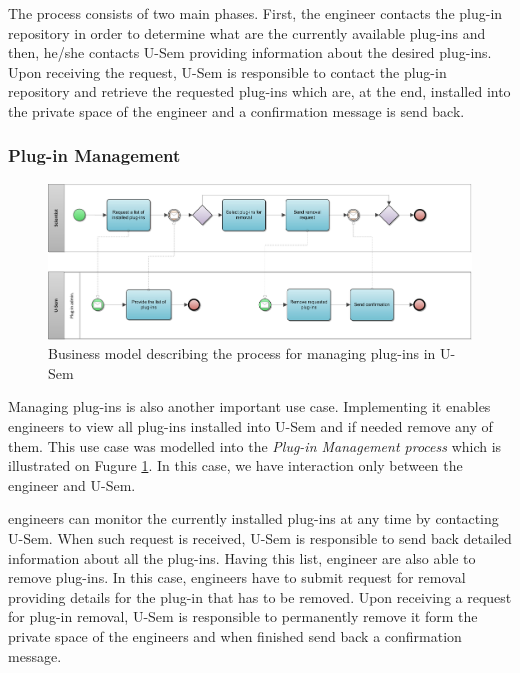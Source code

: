 The process consists of two main phases. First, the engineer contacts the plug-in repository in order to determine what are the currently available plug-ins and then, he/she contacts U-Sem providing information about the desired plug-ins. Upon receiving the request, U-Sem is responsible to contact the plug-in repository and retrieve the requested plug-ins which are, at the end, installed into the private space of the engineer and a confirmation message is send back.

\subsubsection{Plug-in Management}

\begin{figure}[h!]
  \centering
  	\includegraphics[scale=0.7,angle=270]{plug-in/business_processes/PluginManagementBusinessModel.jpg}
  \caption{Business model describing the process for managing plug-ins in U-Sem}
  \label{fig_admin_bpm}
\end{figure}

Managing plug-ins is also another important use case. Implementing it enables engineers to view all plug-ins installed into U-Sem and if needed remove any of them. This use case was modelled into the \textit{Plug-in Management process} which is illustrated on Fugure \ref{fig_admin_bpm}. In this case, we have interaction only between the engineer and U-Sem.

engineers can monitor the currently installed plug-ins at any time by contacting U-Sem. When such request is received, U-Sem is responsible to send back detailed information about all the plug-ins. Having this list, engineer are also able to remove plug-ins. In this case, engineers have to submit request for removal providing details for the plug-in that has to be removed. Upon receiving a request for plug-in removal, U-Sem is responsible to permanently remove it form the private space of the engineers and when finished send back a confirmation message.


